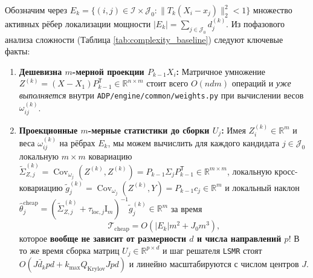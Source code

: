 \documentclass[11pt,a4paper]{article}
\newcommand{\R}{\mathbb{R}}
\newcommand{\Cov}{\operatorname{Cov}}
\newcommand{\Id}{\mathrm{I}}
\newcommand{\T}{^{\mathsf{T}}}
\newcommand{\TEDR}{T}
\newcommand{\II}{\mathcal{I}}
\newcommand{\JJJ}{\mathcal{J}}
\theoremstyle{definition}
\theoremstyle{remark}
\begin{document}
Обозначим через $E_k = \{(i,j) \in \II \times \JJJ_0 : \|\TEDR_k(X_i - x_j)\|_2^2 < 1\}$ множество активных рёбер локализации мощности $|E_k| = \sum_{j \in \JJJ_0} d_j^{(k)}$. Из пофазового анализа сложности (Таблица \ref{tab:complexity_baseline}) следуют ключевые факты:
\begin{enumerate}
    \item \textbf{Дешевизна $m$-мерной проекции $P_{k-1} X_i$:} Матричное умножение $Z^{(k)} = (X - X_1)P_{k-1}\T \in \R^{n \times m}$ стоит всего $O(n d m)$ операций и \emph{уже выполняется} внутри \texttt{ADP/engine/common/weights.py} при вычислении весов $\omega_{ij}^{(k)}$.
    \item \textbf{Проекционные $m$-мерные статистики до сборки $U_j$:} Имея $Z_i^{(k)} \in \R^m$ и веса $\omega_{ij}^{(k)}$ на рёбрах $E_k$, мы можем вычислить для каждого кандидата $j \in \JJJ_0$ локальную $m \times m$ ковариацию $\widetilde{\Sigma}_{Z,j}^{(k)} = \Cov_{\omega_j}(Z^{(k)}, Z^{(k)}) = P_{k-1}\Sigma_j P_{k-1}\T \in \R^{m \times m}$, локальную кросс-ковариацию $\tilde{g}_j^{(k)} = \Cov_{\omega_j}(Z^{(k)}, Y) = P_{k-1} c_j \in \R^m$ и локальный наклон $\hat{\theta}_j^{\mathrm{cheap}} = (\widetilde{\Sigma}_{Z,j}^{(k)} + \tau_{\mathrm{loc},j}\Id_m)^{-1}\tilde{g}_j^{(k)} \in \R^m$ за время
    \[
        \mathcal{T}_{\mathrm{cheap}} = O(|E_k| m^2 + J_0 m^3),
    \]
    которое \textbf{вообще не зависит от размерности $d$ и числа направлений $p$}! В то же время сборка матриц $U_j \in \R^{p \times d}$ и шаг решателя \texttt{LSMR} стоят $O(J \bar{d}_k p d + k_{\max} Q_{\mathrm{Krylov}} J p d)$ и линейно масштабируются с числом центров $J$.
\end{enumerate}
\end{document}

